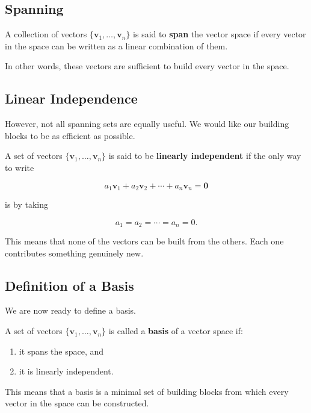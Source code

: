 \documentclass[11pt,openany]{book}
\theoremstyle{definition}
\begin{document}
\subsection{Spanning}

A collection of vectors $\{\mathbf{v}_1, \dots, \mathbf{v}_n\}$ is said to \textbf{span} the vector space 
if every vector in the space can be written as a linear combination of them.

In other words, these vectors are sufficient to build every vector in the space.

\medskip

\subsection{Linear Independence}

However, not all spanning sets are equally useful. 
We would like our building blocks to be as efficient as possible.

A set of vectors $\{\mathbf{v}_1, \dots, \mathbf{v}_n\}$ is said to be \textbf{linearly independent} 
if the only way to write

\[
a_1 \mathbf{v}_1 + a_2 \mathbf{v}_2 + \cdots + a_n \mathbf{v}_n = \mathbf{0}
\]

is by taking

\[
a_1 = a_2 = \cdots = a_n = 0.
\]

This means that none of the vectors can be built from the others. 
Each one contributes something genuinely new.

\medskip

\subsection{Definition of a Basis}

We are now ready to define a basis.

A set of vectors $\{\mathbf{v}_1, \dots, \mathbf{v}_n\}$ is called a \textbf{basis} of a vector space if:

\begin{enumerate}
  \item it spans the space, and
  \item it is linearly independent.
\end{enumerate}

\medskip

This means that a basis is a minimal set of building blocks from which every vector in the space can be constructed.
\end{document}
